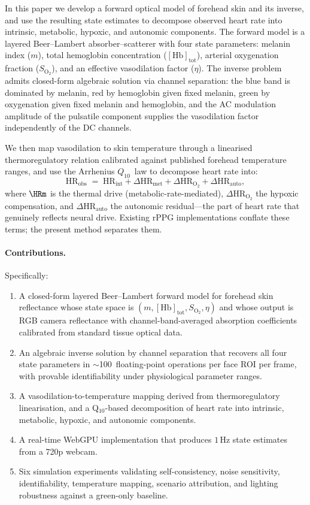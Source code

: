 \documentclass[10pt,twocolumn,a4paper]{article}
\theoremstyle{definition}
\newcommand{\Hb}{\mathrm{Hb}}
\newcommand{\HRobs}{\mathrm{HR}_{\mathrm{obs}}}
\newcommand{\HRint}{\mathrm{HR}_{\mathrm{int}}}
\newcommand{\dHRm}{\Delta\mathrm{HR}_{\mathrm{met}}}
\newcommand{\dHRo}{\Delta\mathrm{HR}_{\mathrm{O_2}}}
\newcommand{\dHRa}{\Delta\mathrm{HR}_{\mathrm{auto}}}
\newcommand{\Qten}{Q_{10}}
\newcommand{\vaso}{\eta}
\newcommand{\melan}{m}
\newcommand{\Hbconc}{[\Hb]_{\mathrm{tot}}}
\newcommand{\Soxy}{S_{\mathrm{O_2}}}
\begin{document}
In this paper we develop a forward optical model of forehead skin and
its inverse, and use the resulting state estimates to decompose
observed heart rate into intrinsic, metabolic, hypoxic, and autonomic
components. The forward model is a layered Beer--Lambert
absorber--scatterer with four state parameters: melanin index
($\melan$), total hemoglobin concentration ($\Hbconc$), arterial
oxygenation fraction ($\Soxy$), and an effective vasodilation factor
($\vaso$). The inverse problem admits closed-form algebraic solution
via channel separation: the blue band is dominated by melanin, red by
hemoglobin given fixed melanin, green by oxygenation given fixed
melanin and hemoglobin, and the AC modulation amplitude of the
pulsatile component supplies the vasodilation factor independently of
the DC channels.

We then map vasodilation to skin temperature through a linearised
thermoregulatory relation calibrated against published forehead
temperature ranges, and use the Arrhenius $\Qten$~law to decompose
heart rate into:
\begin{equation}
    \HRobs \;=\; \HRint + \dHRm + \dHRo + \dHRa,
\end{equation}
where $\HRm$ is the thermal drive (metabolic-rate-mediated), $\dHRo$
the hypoxic compensation, and $\dHRa$ the autonomic
residual---the part of heart rate that genuinely reflects neural
drive. Existing rPPG implementations conflate these terms; the present
method separates them.

\paragraph{Contributions.} Specifically:
\begin{enumerate}[leftmargin=*,nosep]
\item A closed-form layered Beer--Lambert forward model for forehead
  skin reflectance whose state space is $(\melan, \Hbconc, \Soxy,
  \vaso)$ and whose output is RGB camera reflectance with
  channel-band-averaged absorption coefficients calibrated from
  standard tissue optical data.
\item An algebraic inverse solution by channel separation that
  recovers all four state parameters in $\sim$100~floating-point
  operations per face ROI per frame, with provable identifiability
  under physiological parameter ranges.
\item A vasodilation-to-temperature mapping derived from
  thermoregulatory linearisation, and a Q$_{10}$-based decomposition
  of heart rate into intrinsic, metabolic, hypoxic, and autonomic
  components.
\item A real-time WebGPU implementation that produces
  $1\,\mathrm{Hz}$ state estimates from a 720p webcam.
\item Six simulation experiments validating self-consistency,
  noise sensitivity, identifiability, temperature mapping, scenario
  attribution, and lighting robustness against a green-only baseline.
\end{enumerate}
\end{document}
